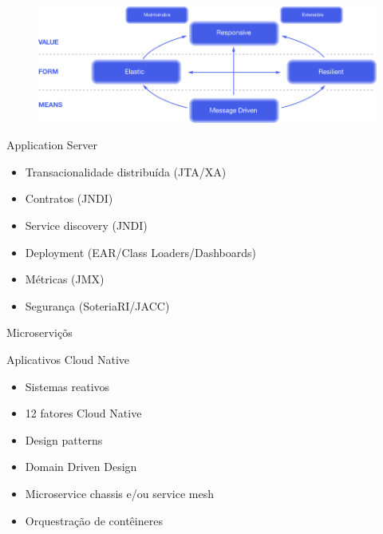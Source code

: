 \documentclass[aspectratio=169]{beamer}
\begin{document}
\begin{frame}{}

\begin{figure}
	\centering
	\includegraphics[width=\linewidth]{Images/reactive-traits.png}
\end{figure}

\end{frame}


\begin{frame}{Application Server}

	\begin{itemize}
		\item Transacionalidade distribuída (JTA/XA)
		\item Contratos (JNDI)
        \item Service discovery (JNDI)
        \item Deployment (EAR/Class Loaders/Dashboards)
		\item Métricas (JMX)
        \item Segurança (SoteriaRI/JACC)
	\end{itemize}

\end{frame}



\begin{frame}{Microserviçõs}

    Aplicativos Cloud Native
	\begin{itemize}
		\item Sistemas reativos
		\item 12 fatores Cloud Native
        \item Design patterns
        \item Domain Driven Design
		\item Microservice chassis e/ou service mesh
        \item Orquestração de contêineres
	\end{itemize}

\end{frame}
\end{document}
